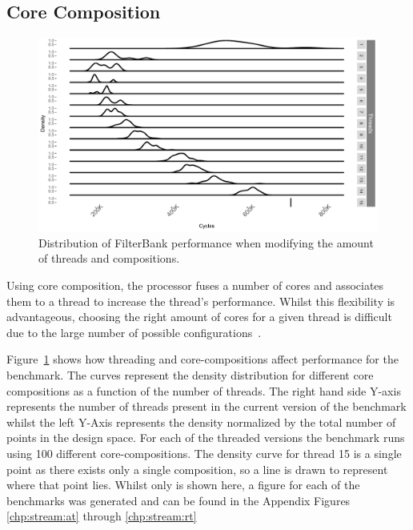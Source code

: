 \subsection{Core Composition}

\begin{figure}[t]
  \includegraphics[width=1\textwidth]{streamit-paper/graphics/filterbank_tot.pdf}
  \caption{Distribution of FilterBank performance when modifying the amount of threads and compositions.}\label{fig:fbtotal}
\end{figure}

Using core composition, the processor fuses a number of cores and associates them to a thread to increase the thread's performance.
Whilst this flexibility is advantageous, choosing the right amount of cores for a given thread is difficult due to the large number of possible configurations~\cite{gulati2008multitaskingdmc}.

Figure~\ref{fig:fbtotal} shows how threading and core-compositions affect performance for the  benchmark.
The curves represent the density distribution for different core compositions as a function of the number of threads.
The right hand side Y-axis represents the number of threads present in the current version of the benchmark whilst the left Y-Axis represents the density normalized by the total number of points in the design space.
For each of the threaded versions the benchmark runs using 100 different core-compositions.
The density curve for thread 15 is a single point as there exists only a single composition, so a line is drawn to represent where that point lies.
Whilst only  is shown here, a figure for each of the benchmarks was generated and can be found in the Appendix Figures \ref{chp:stream:at} through \ref{chp:stream:rt}

